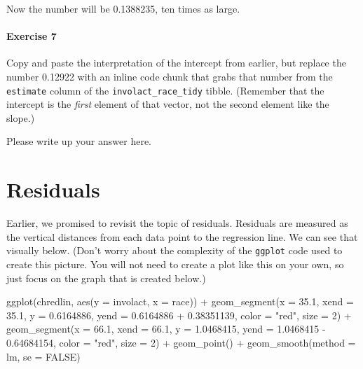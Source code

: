 \documentclass[
]{book}
\newenvironment{Shaded}{\begin{snugshade}}{\end{snugshade}}
\newcommand{\AttributeTok}[1]{\textcolor[rgb]{0.77,0.63,0.00}{#1}}
\newcommand{\ConstantTok}[1]{\textcolor[rgb]{0.00,0.00,0.00}{#1}}
\newcommand{\DecValTok}[1]{\textcolor[rgb]{0.00,0.00,0.81}{#1}}
\newcommand{\FloatTok}[1]{\textcolor[rgb]{0.00,0.00,0.81}{#1}}
\newcommand{\FunctionTok}[1]{\textcolor[rgb]{0.00,0.00,0.00}{#1}}
\newcommand{\NormalTok}[1]{#1}
\newcommand{\SpecialCharTok}[1]{\textcolor[rgb]{0.00,0.00,0.00}{#1}}
\newcommand{\StringTok}[1]{\textcolor[rgb]{0.31,0.60,0.02}{#1}}
\begin{document}
Now the number will be 0.1388235, ten times as large.

\hypertarget{exercise-7-1}{%
\paragraph*{Exercise 7}\label{exercise-7-1}}

Copy and paste the interpretation of the intercept from earlier, but replace the number 0.12922 with an inline code chunk that grabs that number from the \texttt{estimate} column of the \texttt{involact\_race\_tidy} tibble. (Remember that the intercept is the \emph{first} element of that vector, not the second element like the slope.)

Please write up your answer here.

\hypertarget{regression-residuals}{%
\section{Residuals}\label{regression-residuals}}

Earlier, we promised to revisit the topic of residuals. Residuals are measured as the vertical distances from each data point to the regression line. We can see that visually below. (Don't worry about the complexity of the \texttt{ggplot} code used to create this picture. You will not need to create a plot like this on your own, so just focus on the graph that is created below.)

\begin{Shaded}
\begin{Highlighting}[]
\FunctionTok{ggplot}\NormalTok{(chredlin, }\FunctionTok{aes}\NormalTok{(}\AttributeTok{y =}\NormalTok{ involact, }\AttributeTok{x =}\NormalTok{ race)) }\SpecialCharTok{+}
    \FunctionTok{geom\_segment}\NormalTok{(}\AttributeTok{x =} \FloatTok{35.1}\NormalTok{, }\AttributeTok{xend  =} \FloatTok{35.1}\NormalTok{,}
                 \AttributeTok{y =} \FloatTok{0.6164886}\NormalTok{, }\AttributeTok{yend =} \FloatTok{0.6164886} \SpecialCharTok{+} \FloatTok{0.38351139}\NormalTok{,}
                 \AttributeTok{color =} \StringTok{"red"}\NormalTok{, }\AttributeTok{size =} \DecValTok{2}\NormalTok{) }\SpecialCharTok{+}
    \FunctionTok{geom\_segment}\NormalTok{(}\AttributeTok{x =} \FloatTok{66.1}\NormalTok{, }\AttributeTok{xend =} \FloatTok{66.1}\NormalTok{,}
                 \AttributeTok{y =} \FloatTok{1.0468415}\NormalTok{, }\AttributeTok{yend =} \FloatTok{1.0468415} \SpecialCharTok{{-}} \FloatTok{0.64684154}\NormalTok{,}
                 \AttributeTok{color =} \StringTok{"red"}\NormalTok{, }\AttributeTok{size =} \DecValTok{2}\NormalTok{) }\SpecialCharTok{+}
    \FunctionTok{geom\_point}\NormalTok{() }\SpecialCharTok{+}
    \FunctionTok{geom\_smooth}\NormalTok{(}\AttributeTok{method =}\NormalTok{ lm, }\AttributeTok{se =} \ConstantTok{FALSE}\NormalTok{)}
\end{Highlighting}
\end{Shaded}
\end{document}

